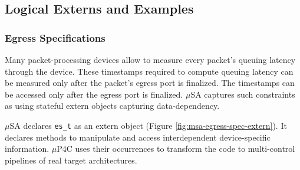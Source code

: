 
\subsection{Logical Externs and Examples}

\subsubsection{Egress Specifications}
Many packet-processing devices allow to measure every packet's queuing latency through the device.
These timestamps required to compute queuing latency can be measured only after the packet's egress port is finalized.
The timestamps can be accessed only after the egress port is finalized.
$\mu$SA captures such constraints as using stateful extern objects capturing data-dependency.

$\mu$SA declares \texttt{es\_t} as an extern object (Figure \ref{fig:msa-egress-spec-extern}).
It declares methods to manipulate and access interdependent device-specific information.
$\mu$P4C uses their occurrences to transform the code to multi-control pipelines of real target architectures.




